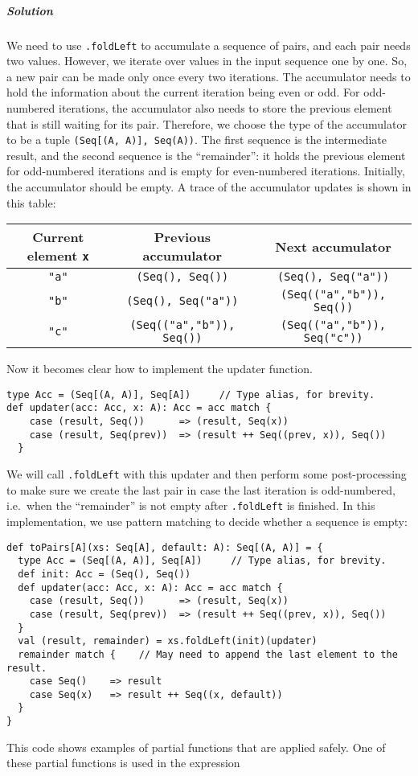 \subparagraph{Solution}

We need to use \lstinline!.foldLeft! to accumulate a sequence of
pairs, and each pair needs two values. However, we iterate over values
in the input sequence one by one. So, a new pair can be made only
once every two iterations. The accumulator needs to hold the information
about the current iteration being even or odd. For odd-numbered iterations,
the accumulator also needs to store the previous element that is still
waiting for its pair. Therefore, we choose the type of the accumulator
to be a tuple \lstinline!(Seq[(A, A)], Seq(A))!. The first sequence
is the intermediate result, and the second sequence is the ``remainder'':
it holds the previous element for odd-numbered iterations and is empty
for even-numbered iterations. Initially, the accumulator should be
empty. A trace of the accumulator updates is shown in this table:
\begin{center}
\begin{tabular}{|c|c|c|}
\hline 
\textbf{\small{}Current element }\lstinline!x! & \textbf{\small{}Previous accumulator} & \textbf{\small{}Next accumulator}\tabularnewline
\hline 
\hline 
{\small{}}\lstinline!"a"! & {\small{}}\lstinline!(Seq(), Seq())! & {\small{}}\lstinline!(Seq(), Seq("a"))!\tabularnewline
\hline 
{\small{}}\lstinline!"b"! & {\small{}}\lstinline!(Seq(), Seq("a"))! & {\small{}}\lstinline!(Seq(("a","b")), Seq())!\tabularnewline
\hline 
{\small{}}\lstinline!"c"! & {\small{}}\lstinline!(Seq(("a","b")), Seq())! & {\small{}}\lstinline!(Seq(("a","b")), Seq("c"))!\tabularnewline
\hline 
\end{tabular}
\par\end{center}

Now it becomes clear how to implement the updater function.
\begin{lstlisting}
type Acc = (Seq[(A, A)], Seq[A])     // Type alias, for brevity.
def updater(acc: Acc, x: A): Acc = acc match {
    case (result, Seq())      => (result, Seq(x))
    case (result, Seq(prev))  => (result ++ Seq((prev, x)), Seq())
  }
\end{lstlisting}
We will call \lstinline!.foldLeft! with this updater and then perform
some post-processing to make sure we create the last pair in case
the last iteration is odd-numbered, i.e.~when the ``remainder''
is not empty after \lstinline!.foldLeft! is finished. In this implementation,
we use pattern matching to decide whether a sequence is empty:
\begin{lstlisting}
def toPairs[A](xs: Seq[A], default: A): Seq[(A, A)] = {
  type Acc = (Seq[(A, A)], Seq[A])     // Type alias, for brevity.
  def init: Acc = (Seq(), Seq())
  def updater(acc: Acc, x: A): Acc = acc match {
    case (result, Seq())      => (result, Seq(x))
    case (result, Seq(prev))  => (result ++ Seq((prev, x)), Seq())
  }
  val (result, remainder) = xs.foldLeft(init)(updater)
  remainder match {    // May need to append the last element to the result.
    case Seq()    => result
    case Seq(x)   => result ++ Seq((x, default))
  }
}
\end{lstlisting}
This code shows examples of partial functions that are applied safely.
One of these partial functions is used in the expression

